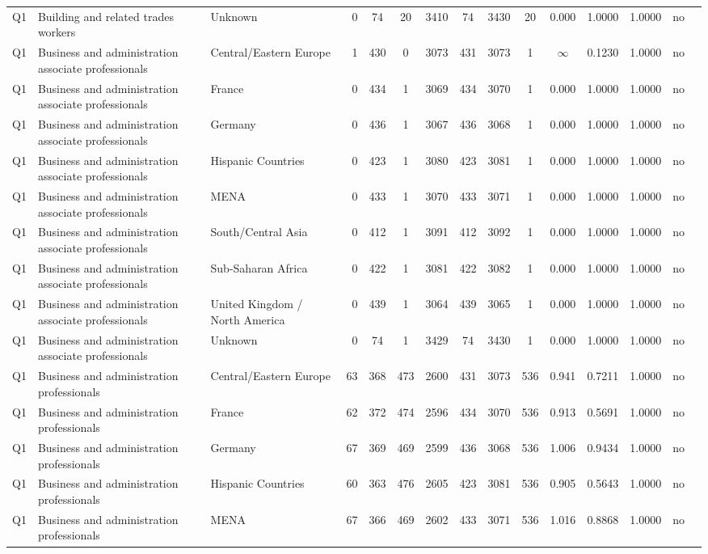 \begin{longtable}{lllrcccccccccll}
Q1 & Building and related trades workers & Unknown & 0 & 74 & 20 & 3410 & 74 & 3430 & 20 & 0.000 & 1.0000 & 1.0000 & no \\
Q1 & Business and administration associate professionals & Central/Eastern Europe & 1 & 430 & 0 & 3073 & 431 & 3073 & 1 & $\infty$ & 0.1230 & 1.0000 & no \\
Q1 & Business and administration associate professionals & France & 0 & 434 & 1 & 3069 & 434 & 3070 & 1 & 0.000 & 1.0000 & 1.0000 & no \\
Q1 & Business and administration associate professionals & Germany & 0 & 436 & 1 & 3067 & 436 & 3068 & 1 & 0.000 & 1.0000 & 1.0000 & no \\
Q1 & Business and administration associate professionals & Hispanic Countries & 0 & 423 & 1 & 3080 & 423 & 3081 & 1 & 0.000 & 1.0000 & 1.0000 & no \\
Q1 & Business and administration associate professionals & MENA & 0 & 433 & 1 & 3070 & 433 & 3071 & 1 & 0.000 & 1.0000 & 1.0000 & no \\
Q1 & Business and administration associate professionals & South/Central Asia & 0 & 412 & 1 & 3091 & 412 & 3092 & 1 & 0.000 & 1.0000 & 1.0000 & no \\
Q1 & Business and administration associate professionals & Sub-Saharan Africa & 0 & 422 & 1 & 3081 & 422 & 3082 & 1 & 0.000 & 1.0000 & 1.0000 & no \\
Q1 & Business and administration associate professionals & United Kingdom / North America & 0 & 439 & 1 & 3064 & 439 & 3065 & 1 & 0.000 & 1.0000 & 1.0000 & no \\
Q1 & Business and administration associate professionals & Unknown & 0 & 74 & 1 & 3429 & 74 & 3430 & 1 & 0.000 & 1.0000 & 1.0000 & no \\
Q1 & Business and administration professionals & Central/Eastern Europe & 63 & 368 & 473 & 2600 & 431 & 3073 & 536 & 0.941 & 0.7211 & 1.0000 & no \\
Q1 & Business and administration professionals & France & 62 & 372 & 474 & 2596 & 434 & 3070 & 536 & 0.913 & 0.5691 & 1.0000 & no \\
Q1 & Business and administration professionals & Germany & 67 & 369 & 469 & 2599 & 436 & 3068 & 536 & 1.006 & 0.9434 & 1.0000 & no \\
Q1 & Business and administration professionals & Hispanic Countries & 60 & 363 & 476 & 2605 & 423 & 3081 & 536 & 0.905 & 0.5643 & 1.0000 & no \\
Q1 & Business and administration professionals & MENA & 67 & 366 & 469 & 2602 & 433 & 3071 & 536 & 1.016 & 0.8868 & 1.0000 & no \\

\end{longtable}
